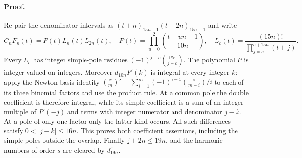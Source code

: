 \paragraph{Proof.}
Re-pair the denominator intervals as
$(t+n)_{15n+1}(t+2n)_{15n+1}$ and write
\[
 C_nF_n(t)=P(t)L_n(t)L_{2n}(t),\quad
 P(t)=\prod_{u=0}^2\binom{t-un-1}{10n},\quad
 L_c(t)=\frac{(15n)!}{\prod_{j=c}^{c+15n}(t+j)}.
\]
Every $L_c$ has integer simple-pole residues
$(-1)^{j-c}\binom{15n}{j-c}$.
The polynomial $P$ is integer-valued on integers.  Moreover
$d_{10n}P'(k)$ is integral at every integer $k$: apply the Newton-basis
identity
$\binom{x}{m}'=\sum_{i=1}^m(-1)^{i-1}\binom{x}{m-i}/i$
to each of its three binomial factors and use the product rule.
At a common pole the double coefficient is therefore integral, while its
simple coefficient is a sum of an integer multiple of $P'(-j)$ and
terms with integer numerator and denominator $j-k$.  At a pole of only one
factor only the latter kind occurs.  All such differences satisfy
$0<|j-k|\le16n$.  This proves both coefficient assertions, including the
simple poles outside the overlap.  Finally $j+2n\le19n$, and the harmonic
numbers of order $s$ are cleared by $d_{19n}^s$.
